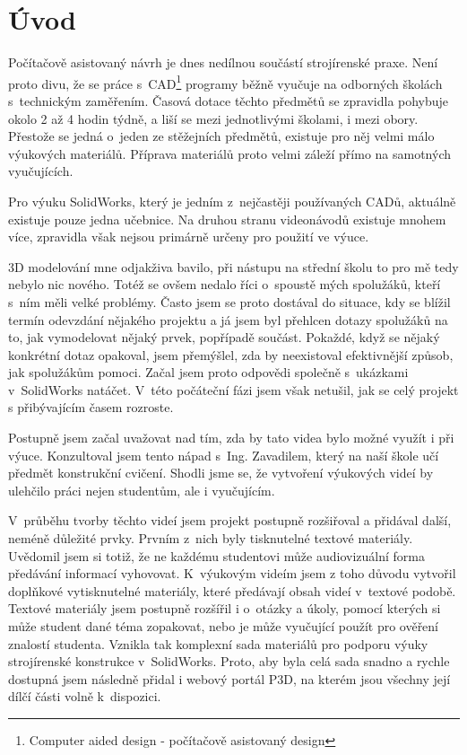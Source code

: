 \chapter*{Úvod}
Počítačově asistovaný návrh je dnes nedílnou součástí strojírenské praxe.
Není proto divu, že se práce s~CAD\footnote{Computer aided design - počítačově asistovaný design} programy běžně vyučuje na odborných školách s~technickým zaměřením.
Časová dotace těchto předmětů se zpravidla pohybuje okolo 2 až 4 hodin týdně, a liší se mezi jednotlivými školami, i mezi obory.
Přestože se jedná o~jeden ze stěžejních předmětů, existuje pro něj velmi málo výukových materiálů.
Příprava materiálů proto velmi záleží přímo na samotných vyučujících.

Pro výuku SolidWorks, který je jedním z~nejčastěji používaných CADů, aktuálně existuje pouze jedna učebnice.
Na druhou stranu videonávodů existuje mnohem více, zpravidla však nejsou primárně určeny pro použití ve výuce.

3D modelování mne odjakživa bavilo, při nástupu na střední školu to pro mě tedy nebylo nic nového.
Totéž se ovšem nedalo říci o~spoustě mých spolužáků, kteří s~ním měli velké problémy.
Často jsem se proto dostával do situace, kdy se blížil termín odevzdání nějakého projektu a já jsem byl přehlcen dotazy spolužáků na to, jak vymodelovat nějaký prvek, popřípadě součást.
Pokaždé, když se nějaký konkrétní dotaz opakoval, jsem přemýšlel, zda by neexistoval efektivnější způsob, jak spolužákům pomoci.
Začal jsem proto odpovědi společně s~ukázkami v~SolidWorks natáčet.
V~této počáteční fázi jsem však netušil, jak se celý projekt s přibývajícím časem rozroste.

Postupně jsem začal uvažovat nad tím, zda by tato videa bylo možné využít i při výuce.
Konzultoval jsem tento nápad s~Ing. Zavadilem, který na naší škole učí předmět konstrukční cvičení.
Shodli jsme se, že vytvoření výukových videí by ulehčilo práci nejen studentům, ale i vyučujícím.

V~průběhu tvorby těchto videí jsem projekt postupně rozšiřoval a přidával další, neméně důležité prvky.
Prvním z~nich byly tisknutelné textové materiály.
Uvědomil jsem si totiž, že ne každému studentovi může audiovizuální forma předávání informací vyhovovat.
K~výukovým videím jsem z toho důvodu vytvořil doplňkové vytisknutelné materiály, které předávají obsah videí v~textové podobě.
Textové materiály jsem postupně rozšířil i o~otázky a úkoly, pomocí kterých si může student dané téma zopakovat, nebo je může vyučující použít pro ověření znalostí studenta.
Vznikla tak komplexní sada materiálů pro podporu výuky strojírenské konstrukce v~SolidWorks.
Proto, aby byla celá sada snadno a rychle dostupná jsem následně přidal i webový portál P3D, na kterém jsou všechny její dílčí části volně k~dispozici.

